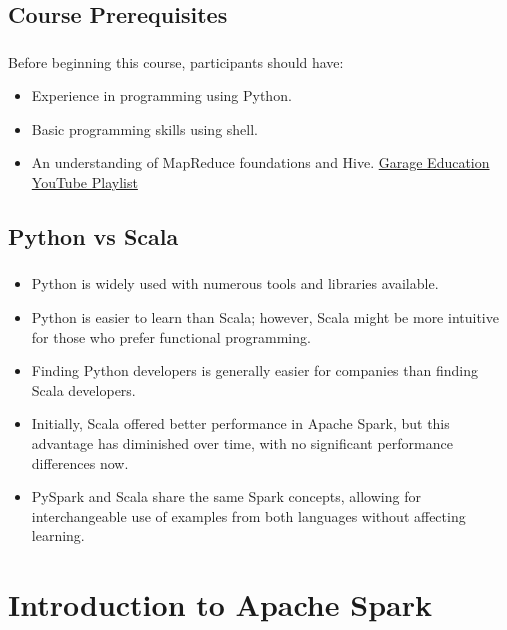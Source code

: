 \subsection{Course Prerequisites}
\begin{frame}
\frametitle{\subsecname}
Before beginning this course, participants should have:
\begin{itemize}
    \item Experience in programming using Python.  \pause
    \item Basic programming skills using shell.  \pause
    \item An understanding of MapReduce foundations and Hive. \href{https://www.youtube.com/playlist?list=PLxNoJq6k39G8Ak39PDC-oYvp6ZRvIn3Pa}{Garage Education YouTube Playlist}  \pause
\end{itemize}

\end{frame}

\subsection{Python vs Scala}
\begin{frame}
\frametitle{\subsecname}
\begin{itemize}
	\item Python is widely used with numerous tools and libraries available. \pause
	\item Python is easier to learn than Scala; however, Scala might be more intuitive for those who prefer functional programming. \pause
	\item Finding Python developers is generally easier for companies than finding Scala developers. \pause
	\item Initially, Scala offered better performance in Apache Spark, but this advantage has diminished over time, with no significant performance differences now. \pause
	\item PySpark and Scala share the same Spark concepts, allowing for interchangeable use of examples from both languages without affecting learning. \pause
\end{itemize}
\end{frame}

\section{Introduction to Apache Spark}
